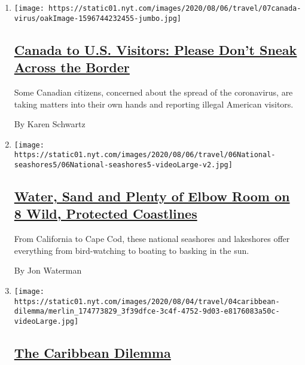 \begin{enumerate}
\def\labelenumi{\arabic{enumi}.}
\item
  \texttt{[image: https://static01.nyt.com/images/2020/08/06/travel/07canada-virus/oakImage-1596744232455-jumbo.jpg]}

  \hypertarget{canada-to-us-visitors-please-dont-sneak-across-the-border}{%
  \subsection{\texorpdfstring{\href{/2020/08/07/travel/Canada-border-crossings-coronavirus.html}{Canada
  to U.S. Visitors: Please Don't Sneak Across the
  Border}}{Canada to U.S. Visitors: Please Don't Sneak Across the Border}}\label{canada-to-us-visitors-please-dont-sneak-across-the-border}}

  Some Canadian citizens, concerned about the spread of the coronavirus,
  are taking matters into their own hands and reporting illegal American
  visitors.

  By Karen Schwartz
\item
  \texttt{[image: https://static01.nyt.com/images/2020/08/06/travel/06National-seashores5/06National-seashores5-videoLarge-v2.jpg]}

  \hypertarget{water-sand-and-plenty-of-elbow-room-on-8-wild-protected-coastlines}{%
  \subsection{\texorpdfstring{\href{/2020/08/06/travel/National-Seashores.html}{Water,
  Sand and Plenty of Elbow Room on 8 Wild, Protected
  Coastlines}}{Water, Sand and Plenty of Elbow Room on 8 Wild, Protected Coastlines}}\label{water-sand-and-plenty-of-elbow-room-on-8-wild-protected-coastlines}}

  From California to Cape Cod, these national seashores and lakeshores
  offer everything from bird-watching to boating to basking in the sun.

  By Jon Waterman
\item
  \texttt{[image: https://static01.nyt.com/images/2020/08/04/travel/04caribbean-dilemma/merlin\_174773829\_3f39dfce-3c4f-4752-9d03-e8176083a50c-videoLarge.jpg]}

  \hypertarget{the-caribbean-dilemma}{%
  \subsection{\texorpdfstring{\href{/2020/08/04/travel/coronavirus-caribbean-vacations.html}{The
  Caribbean
  Dilemma}}{The Caribbean Dilemma}}\label{the-caribbean-dilemma}}


\end{enumerate}
